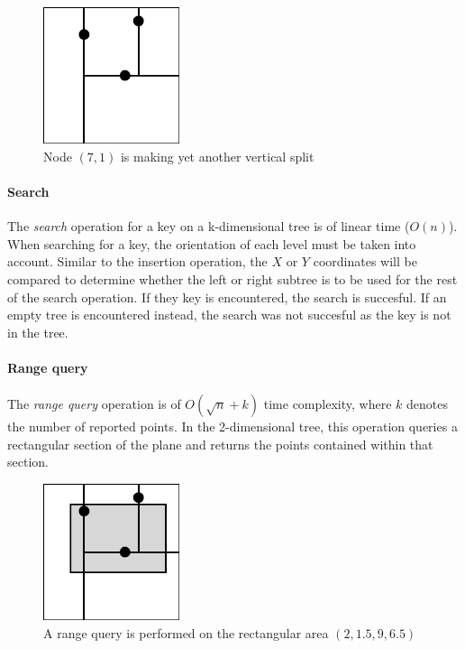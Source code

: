 \documentclass{article}
\begin{document}
\begin{figure}[H]
  \centering
  \includegraphics[width=4cm]{2d_tree_2}
  \caption{Node \((7, 1)\) is making yet another vertical split}
\end{figure}

\paragraph{Search}
The {\em search} operation for a key on a k-dimensional tree is of linear time (\(O(n)\)).
When searching for a key, the orientation of each level must be taken into account.
Similar to the insertion operation, the \(X\) or \(Y\) coordinates will be compared to determine
whether the left or right subtree is to be used for the rest of the search operation.
If they key is encountered, the search is succesful. If an empty tree is encountered instead,
the search was not succesful as the key is not in the tree.

\paragraph{Range query}
The {\em range query} operation is of \(O(\sqrt{n} + k)\) time complexity, where \(k\) denotes the number of
reported points. In the 2-dimensional tree, this operation queries a rectangular section of the plane and
returns the points contained within that section.

\begin{figure}[H]
  \centering
  \includegraphics[width=4cm]{2d_tree_3}
  \caption{A range query is performed on the rectangular area \((2, 1.5, 9, 6.5)\)}
\end{figure}
\end{document}
